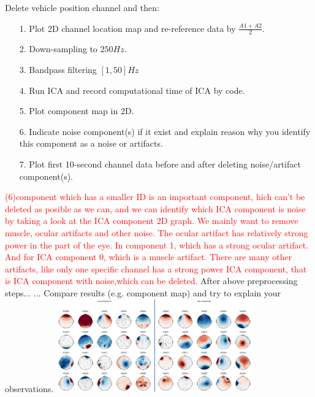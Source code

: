 \documentclass[a4 paper]{article}
\begin{document}
\begin{tcolorbox}[colback=RubineRed!5!white,colframe=RubineRed!75!black]
Delete vehicle position channel and then:  
\begin{itemize}
    \item[1.] Plot 2D channel location map and re-reference data by $\frac{A1+A2}{2}$.
    \item[2.] Down-sampling to $250Hz$.
    \item[3.] Bandpass filtering $[1,50]Hz$ 
    \item[4.] Run ICA and record computational time of ICA by code.
    \item[5.]Plot component map in 2D.
    \item[6.] Indicate noise component(s) if it exist and explain reason why you identify this component as a noise or artifacts.
    \item[7.] Plot first 10-second channel data before and after deleting noise/artifact component(s).
\end{itemize}
\textcolor{red}{(6)component which has a smaller ID is an important component, hich can’t be deleted as posible as we can, and we can identify which ICA component is noise by taking a look at the ICA component 2D graph. We mainly want to remove muscle, ocular artifacts and other noise. The ocular artifact has relatively strong power in the part of the eye. In component 1, which has a strong ocular artifact. And for ICA component 0, which is a muscle artifact. There are many other artifacts, like only one specific channel has a strong power ICA component, that is ICA component with noise,which can be deleted.\newline}
After above preprocessing steps... ...
 Compare results (e.g. component map) and try to explain your observations.
\newline
\includegraphics[height=4cm]{img/ica_res.png}\\

\end{tcolorbox}
\end{document}
